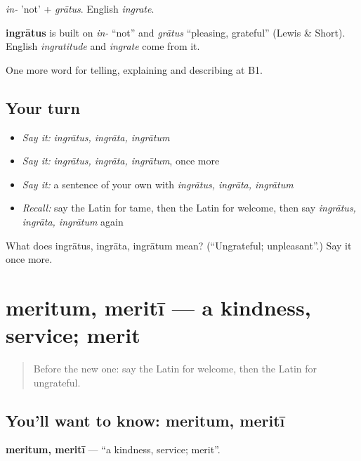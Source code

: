 \emph{in-} 'not' + \emph{grātus}. English \emph{ingrate}.

\begin{cousinweb}
\textbf{ingrātus} is built on \emph{in-} \textquotedblleft{}not\textquotedblright{} and \emph{grātus} \textquotedblleft{}pleasing, grateful\textquotedblright{} (Lewis \& Short). English \emph{ingratitude} and \emph{ingrate} come from it.
\end{cousinweb}

\begin{grammarlens}[title={What you've built}]
One more word for telling, explaining and describing at B1.
\end{grammarlens}

\subsection*{Your turn}
\begin{itemize}
\raggedright
  \item \emph{Say it:} \emph{ingrātus, ingrāta, ingrātum}
  \item \emph{Say it:} \emph{ingrātus, ingrāta, ingrātum}, once more
  \item \emph{Say it:} a sentence of your own with \emph{ingrātus, ingrāta, ingrātum}
  \item \emph{Recall:} say the Latin for tame, then the Latin for welcome, then say \emph{ingrātus, ingrāta, ingrātum} again
\end{itemize}

\begin{tcolorbox}[breakable,colback=teal!4,colframe=teal!35!black,title={Before you move on}]
What does ingrātus, ingrāta, ingrātum mean? (\textquotedblleft{}Ungrateful; unpleasant\textquotedblright{}.) Say it once more.
\end{tcolorbox}
\section[meritum, meritī]{meritum, meritī — a kindness, service; merit}

\label{lesson:LA-C512-meritum}



\begin{quote}
Before the new one: say the Latin for welcome, then the Latin for ungrateful.
\end{quote}

\subsection*{You'll want to know: meritum, meritī}
\textbf{meritum, meritī} — \textquotedblleft{}a kindness, service; merit\textquotedblright{}.

